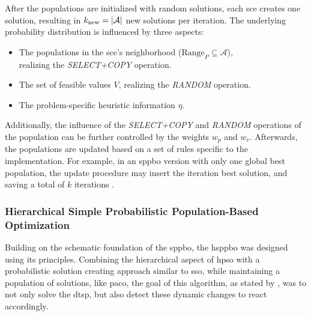 After the populations are initialized with random solutions, each \gls{sce} creates one solution, resulting in $k_{\text{new}} = \left\lvert\mathcal{A}\right\rvert$ new solutions per iteration. The underlying probability distribution is influenced by three aspects:
\begin{itemize}
	\item The populations in the \gls{sce}'s neighborhood ($\text{Range}_P \subseteq \mathcal{A}$),\\realizing the \textit{SELECT+COPY} operation.
	\item The set of feasible values $V$, realizing the \textit{RANDOM} operation.
	\item The problem-specific heuristic information $\eta$.
\end{itemize}
Additionally, the influence of the \textit{SELECT+COPY} and \textit{RANDOM} operations of the population can be further controlled by the weights $w_p$ and $w_r$. Afterwards, the populations are updated based on a set of rules specific to the implementation. For example, in an \gls{sppbo} version with only one global best population, the update procedure may insert the iteration best solution, and saving a total of $k$ iterations \cite{lin2015simple}.

\subsubsection{Hierarchical Simple Probabilistic Population-Based Optimization}

Building on the schematic foundation of the \gls{sppbo}, the \gls{hsppbo} was designed using its principles. Combining the hierarchical aspect of \gls{hpso} with a probabilistic solution creating approach similar to \gls{sso}, while maintaining a population of solutions, like \gls{paco}, the goal of this algorithm, as stated by \citet{kupfer2021hierarchical}, was to not only solve the \gls{dtsp}, but also detect these dynamic changes to react accordingly. 

